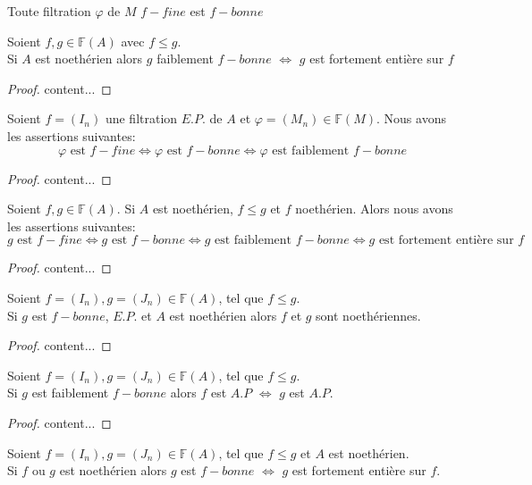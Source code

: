 \begin{maproposition}
	Toute filtration $\varphi$ de $M$ $f-fine$ est $f-bonne$
\end{maproposition}
\begin{maproposition}
	Soient $f,g \in \mathbb{F}(A)$ avec $f \leqslant g$.\\ Si $A$ est noethérien alors $g$ faiblement $f-bonne$ $\Longleftrightarrow$ $g$ est fortement entière sur $f$
\end{maproposition}
\begin{proof}
	content...
\end{proof}
\begin{maproposition}
	Soient $f=(I_n)$ une filtration $E.P.$ de $A$ et $\varphi=(M_n) \in \mathbb{F}(M)$. Nous avons les assertions suivantes:
	\[ \varphi \text{ est } f-fine \Longleftrightarrow \varphi \text{ est } f-bonne \Longleftrightarrow \varphi \text{ est faiblement } f-bonne   \]
\end{maproposition}
\begin{proof}
	content...
\end{proof}
\begin{moncorollaire}
	Soient $f,g \in \mathbb{F}(A)$. Si $A$ est noethérien, $f \leqslant g$ et $f$ noethérien. Alors nous avons les assertions suivantes:
	\[ g \text{ est } f-fine \Longleftrightarrow  g \text{ est } f-bonne \Longleftrightarrow  g \text{ est faiblement } f-bonne \Longleftrightarrow  g \text{ est fortement entière sur } f \]
\end{moncorollaire}
\begin{proof}
	content...
\end{proof}
\begin{maproposition}
	Soient $f=(I_n), g=(J_n) \in \mathbb{F}(A)$, tel que $f \leqslant g$.\\ Si $g$ est $f-bonne$, $E.P.$ et $A$ est noethérien alors $f$ et $g$ sont noethériennes.
\end{maproposition}
\begin{proof}
	content...
\end{proof}
\begin{maproposition}
	Soient $f=(I_n), g=(J_n) \in \mathbb{F}(A)$, tel que $f \leqslant g$.\\ Si $g$ est faiblement $f-bonne$ alors $f$ est $A.P$ $\Longleftrightarrow$ $g$ est $A.P$.
\end{maproposition}
\begin{proof}
	content...
\end{proof}
\begin{moncorollaire}
	Soient $f=(I_n), g=(J_n) \in \mathbb{F}(A)$, tel que $f \leqslant g$ et $A$ est noethérien.\\ Si $f$ ou $g$ est noethérien alors $g$ est $f-bonne$ $\Longleftrightarrow$ $g$ est fortement entière sur $f$.
\end{moncorollaire}
